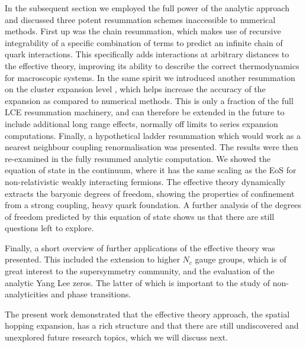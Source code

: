 In the subsequent section we employed the full power of the analytic approach
and discussed three potent resummation schemes inaccessible to numerical
methods.  First up was the chain resummation, which makes use of recursive
integrability of a specific combination of terms to predict an infinite chain of
quark interactions. This specifically adds interactions at arbitrary distances
to the effective theory, improving its ability to describe the correct
thermodynamics for macroscopic systems. In the same spirit we introduced another
resummation on the cluster expansion level , which helps increase the accuracy
of the expansion as compared to numerical methods. This is only a fraction of
the full LCE resummation machinery, and can therefore be extended in the future
to include additional long range effects, normally off limits to series
expansion computations. Finally, a hypothetical ladder resummation which would
work as a nearest neighbour coupling renormalisation was presented. The results
were then re-examined in the fully resummed analytic computation. We showed the
equation of state in the continuum, where it has the same scaling as the EoS for
non-relativistic weakly interacting fermions. The effective theory dynamically
extracts the baryonic degrees of freedom, showing the properties of confinement
from a strong coupling, heavy quark foundation. A further analysis of the
degrees of freedom predicted by this equation of state shows us that there are
still questions left to explore.

Finally, a short overview of further applications of the effective theory was
presented. This included the extension to higher $N_c$ gauge groups, which is of
great interest to the supersymmetry community, and the evaluation of the
analytic Yang Lee zeros. The latter of which is important to the study of
non-analyticities and phase transitions.

The present work demonstrated that the effective theory approach, the spatial
hopping expansion, has a rich structure and that there are still undiscovered
and unexplored future research topics, which we will discuss next.
